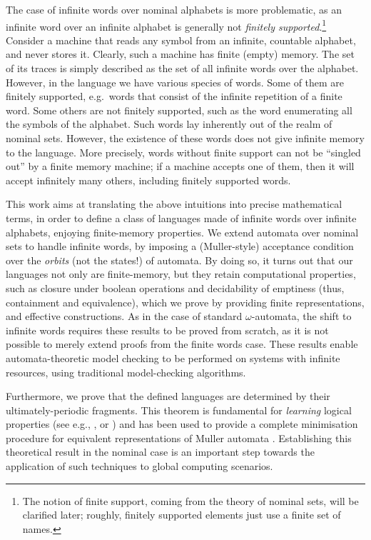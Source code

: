 The case of infinite words over nominal alphabets is more problematic, as an infinite word over an infinite alphabet is generally not \emph{finitely supported}.\footnote{The notion of finite support, coming from the theory of nominal sets, will be clarified later; roughly, finitely supported elements just use a finite set of names.} Consider a machine that reads any symbol from an infinite, countable alphabet, and never stores it. Clearly, such a machine has finite (empty) memory. The set of its traces is simply described as the set of all infinite words over the alphabet. However, in the language we have various species of words. Some of them are finitely supported, e.g.\ words that consist of the infinite repetition of a finite word. Some others are not finitely supported, such as the word enumerating all the symbols of the alphabet. Such words lay inherently out of the realm of nominal sets. However, the existence of these words does not give infinite memory to the language. More precisely, words without finite support can not be ``singled out'' by a finite memory machine; if a machine accepts one of them, then it will accept infinitely many others, including finitely supported words.  

This work aims at translating the above intuitions into precise mathematical terms, in order to define a class of languages made of infinite words over infinite alphabets, enjoying finite-memory properties. We extend automata over nominal sets to handle infinite words, by imposing a (Muller-style) acceptance condition 
over the \emph{orbits} (not the states!) of automata. By doing so, it turns out that our languages not only are finite-memory, but they retain computational properties, such as closure under boolean operations and decidability of emptiness (thus, containment and equivalence), which we prove by providing finite representations, and effective constructions. As in the case of standard $\omega$-automata, the shift to infinite words requires these results to be proved from scratch, as it is not possible to merely extend proofs from the finite words case. These results enable automata-theoretic model checking to be performed on systems with infinite resources, using traditional model-checking algorithms. 

Furthermore, we prove that the defined languages are determined by their ultimately-periodic fragments. This theorem is fundamental for \emph{learning} logical properties (see e.g., \cite{MP95}, or \cite{FCCTW08}) and has been used to provide a complete minimisation procedure for equivalent representations of Muller automata \cite{CV12}. Establishing this theoretical result in the nominal case is an important step towards the application of such techniques to global computing scenarios.

